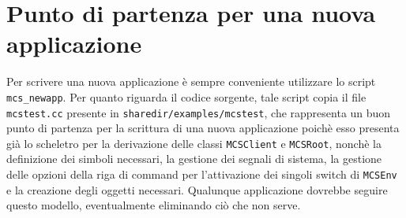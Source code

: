 \section{Punto di partenza per una nuova applicazione}
Per scrivere una nuova applicazione \`e sempre conveniente utilizzare
lo script \verb|mcs_newapp|. Per quanto riguarda il codice sorgente,
tale script copia il file \verb|mcstest.cc| presente in
\verb|sharedir/examples/mcstest|, che rappresenta un buon punto di
partenza per la scrittura di una nuova applicazione poich\`e esso
presenta gi\`a lo scheletro per la derivazione delle classi
\verb|MCSClient| e \verb|MCSRoot|, nonch\`e la definizione dei simboli
necessari, la gestione dei segnali di sistema, la gestione delle
opzioni della riga di command per l'attivazione dei singoli switch di
\verb|MCSEnv| e  la creazione degli oggetti necessari. Qualunque
applicazione dovrebbe seguire questo modello, eventualmente eliminando
ci\`o che non serve.
